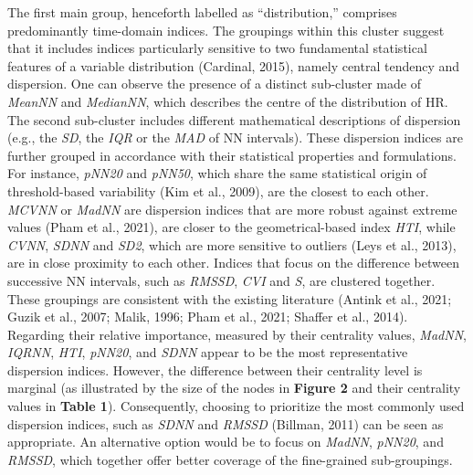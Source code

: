 \documentclass[
  english,
  jou,floatsintext]{apa6}
\begin{document}
The first main group, henceforth labelled as ``distribution,'' comprises predominantly time-domain indices. The groupings within this cluster suggest that it includes indices particularly sensitive to two fundamental statistical features of a variable distribution (Cardinal, 2015), namely central tendency and dispersion. One can observe the presence of a distinct sub-cluster made of \emph{MeanNN} and \emph{MedianNN}, which describes the centre of the distribution of HR. The second sub-cluster includes different mathematical descriptions of dispersion (e.g., the \emph{SD}, the \emph{IQR} or the \emph{MAD} of NN intervals). These dispersion indices are further grouped in accordance with their statistical properties and formulations. For instance, \emph{pNN20} and \emph{pNN50}, which share the same statistical origin of threshold-based variability (Kim et al., 2009), are the closest to each other. \emph{MCVNN} or \emph{MadNN} are dispersion indices that are more robust against extreme values (Pham et al., 2021), are closer to the geometrical-based index \emph{HTI}, while \emph{CVNN}, \emph{SDNN} and \emph{SD2}, which are more sensitive to outliers (Leys et al., 2013), are in close proximity to each other. Indices that focus on the difference between successive NN intervals, such as \emph{RMSSD}, \emph{CVI} and \emph{S}, are clustered together. These groupings are consistent with the existing literature (Antink et al., 2021; Guzik et al., 2007; Malik, 1996; Pham et al., 2021; Shaffer et al., 2014). Regarding their relative importance, measured by their centrality values, \emph{MadNN}, \emph{IQRNN}, \emph{HTI}, \emph{pNN20}, and \emph{SDNN} appear to be the most representative dispersion indices. However, the difference between their centrality level is marginal (as illustrated by the size of the nodes in \textbf{Figure 2} and their centrality values in \textbf{Table 1}). Consequently, choosing to prioritize the most commonly used dispersion indices, such as \emph{SDNN} and \emph{RMSSD} (Billman, 2011) can be seen as appropriate. An alternative option would be to focus on \emph{MadNN}, \emph{pNN20}, and \emph{RMSSD}, which together offer better coverage of the fine-grained sub-groupings.
\end{document}
